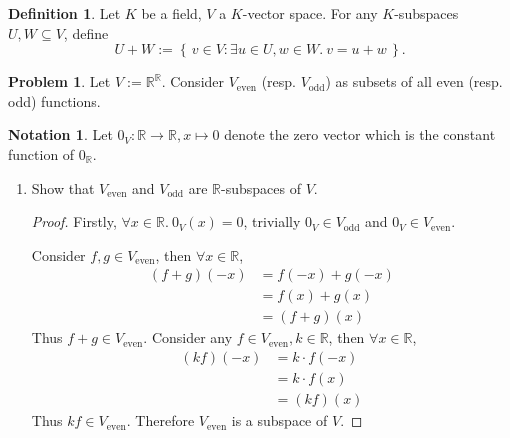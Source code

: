 \documentclass{article}
\theoremstyle{definition}
\newtheorem{problem}{Problem}
\newtheorem*{definition}{Definition}
\newtheorem*{notation}{Notation}
\numberwithin{equation}{problem}
\newcommand{\R}{\mathbb{R}}
\newcommand{\set}[1]{\left\{\,#1\,\right\}}
\renewcommand{\vec}[1]{\mathit{#1}_V}
\begin{document}
\begin{definition}
    Let $K$ be a field, $V$ a $K$-vector space. For any $K$-subspaces $U, W \subseteq V$, define
    \[
        U + W := \set{ v\in V: \exists u\in U, w\in W.~ v = u + w }.
    \]
\end{definition}
\begin{problem}
    Let $V:=\R^\R$. Consider $V_\text{even}$ (resp. $V_\text{odd}$) as subsets of all even (resp. odd) functions.
\end{problem}
\begin{notation}
    Let $\vec{0} : \R \to \R, x \mapsto 0$ denote the zero vector which is the constant function of $0_\R$.
\end{notation}
\begin{enumerate}[label=(\alph*)]
    \item Show that $V_\text{even}$ and $V_\text{odd}$ are $\R$-subspaces of $V$.
        \begin{proof}
            Firstly, $\forall x \in \R.~ \vec{0}(x) = 0$, trivially $\vec{0} \in V_\text{odd}$ and $\vec{0} \in V_\text{even}$.

            Consider $f,g\in V_\text{even}$, then $\forall x\in \R$,
            \begin{align*}
                (f+g)(-x) &= f(-x) + g(-x)  \\
                &= f(x) + g(x) \\
                &= (f+g)(x)
            \end{align*}
            Thus $f+g \in V_\text{even}$.
            Consider any $f\in V_\text{even}, k\in \R$, then $\forall x\in \R$,
            \begin{align*}
                (kf)(-x) &= k\cdot f(-x)    \\
                &= k\cdot f(x)  \\
                &= (kf)(x)
            \end{align*}
            Thus $kf \in V_\text{even}$.
            Therefore $V_\text{even}$ is a subspace of $V$.


\end{proof}
\end{enumerate}
\end{document}
